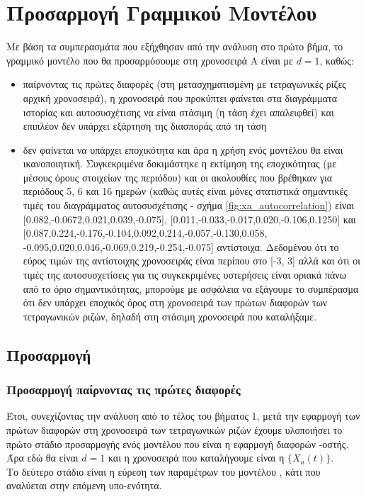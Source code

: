 \chapter{Προσαρμογή Γραμμικού Μοντέλου}
\label{ch:step2}
\thispagestyle{fancy}

Με βάση τα συμπερασμάτα που εξήχθησαν από την ανάλυση στο πρώτο βήμα, το γραμμικό μοντέλο που θα προσαρμόσουμε στη χρονοσειρά Α είναι  με $d=1$, καθώς:
\begin{itemize}
    \item παίρνοντας τις πρώτες διαφορές (στη μετασχηματισμένη με τετραγωνικές ρίζες αρχική χρονοσειρά), η χρονοσειρά που προκύπτει φαίνεται στα διαγράμματα ιστορίας και αυτοσυσχέτισης να είναι στάσιμη (η τάση έχει απαλειφθεί) και επιπλέον δεν υπάρχει εξάρτηση της διασποράς από τη τάση
    \item δεν φαίνεται να υπάρχει εποχικότητα και άρα η χρήση ενός  μοντέλου θα είναι ικανοποιητική. Συγκεκριμένα δοκιμάστηκε η εκτίμηση της εποχικότητας (με μέσους όρους στοιχείων της περιόδου) και οι ακολουθίες που βρέθηκαν για περιόδους 5, 6 και 16 ημερών (καθώς αυτές είναι μόνες στατιστικά σημαντικές τιμές του διαγράμματος αυτοσυσχέτισης - σχήμα \ref{fig:xa_autocorrelation}) είναι [0.082,-0.0672,0.021,0.039,-0.075], [0.011,-0.033,-0.017,0.020,-0.106,0.1250] και [0.087,0.224,-0.176,-0.104,0.092,0.214,-0.057,-0.130,0.058,\\ -0.095,0.020,0.046,-0.069,0.219,-0.254,-0.075] αντίστοιχα. Δεδομένου ότι το εύρος τιμών της αντίστοιχης χρονοσειράς είναι περίπου στο [-3, 3] αλλά και ότι οι τιμές της αυτοσυσχετίσεις για τις συγκεκριμένες υστερήσεις είναι οριακά πάνω από το όριο σημαντικότητας, μπορούμε με ασφάλεια να εξάγουμε το συμπέρασμα ότι δεν υπάρχει εποχικός όρος στη χρονοσειρά των πρώτων διαφορών των τετραγωνικών ριζών, δηλαδή στη στάσιμη χρονοσειρά που καταλήξαμε.
\end{itemize}

\section{Προσαρμογή }

\subsection{Προσαρμογή  παίρνοντας τις πρώτες διαφορές}

Έτσι, συνεχίζοντας την ανάλυση από το τέλος του βήματος 1, μετά την εφαρμογή των πρώτων διαφορών στη χρονοσειρά των τετραγωνικών ριζών έχουμε υλοποιήσει το πρώτο στάδιο προσαρμογής ενός μοντέλου  που είναι η εφαρμογή διαφορών -οστής. Άρα εδώ θα είναι $d=1$ και η χρονοσειρά που καταλήγουμε είναι η $\{X_a(t)\}$.\\
Το δεύτερο στάδιο είναι η εύρεση των παραμέτρων του μοντέλου , κάτι που αναλύεται στην επόμενη υπο-ενότητα. 

